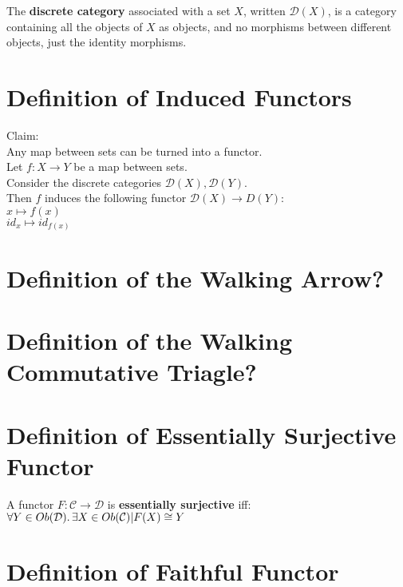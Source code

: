 \documentclass[a4paper, twoside, english, 11pt]{book}
\newcommand{\C}{\mathcal C}
\newcommand{\D}{\mathcal D}
\begin{document}
The \textbf{discrete category} associated with a set $X$, written $\D(X)$, is a category containing all the objects of $X$ as objects, and no morphisms between different objects, just the identity morphisms.



\section{Definition of Induced Functors}

Claim: \\
Any map between sets can be turned into a functor. \\

\noindent
Let $f : X \rightarrow Y$ be a map between sets. \\

\noindent
Consider the discrete categories $\D(X), \D(Y)$. \\

\noindent
Then $f$ induces the following functor $\D(X) \rightarrow D(Y)$: \\
\indent
$x \mapsto f(x)$ \\
\indent
$id_x \mapsto id_{f(x)}$



\section{Definition of the Walking Arrow?}



\section{Definition of the Walking Commutative Triagle?}




\section{Definition of Essentially Surjective Functor}

A functor $F : \C \rightarrow \D$ is \textbf{essentially surjective} iff: \\

$\forall Y \in Ob(\D) \ldotp \exists X \in Ob(\C) | F(X) \cong Y$



\section{Definition of Faithful Functor}
\end{document}

